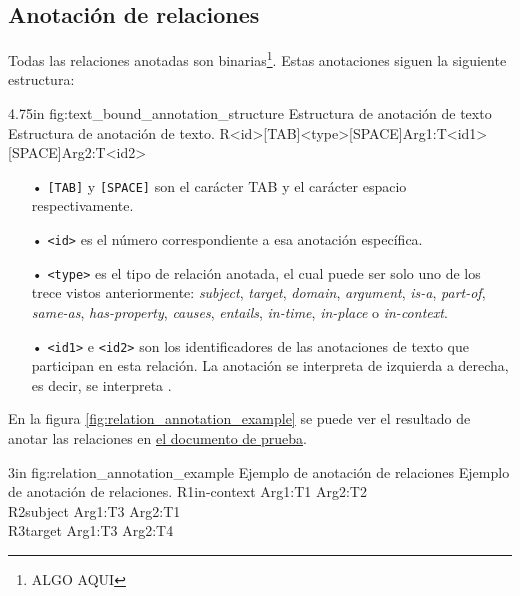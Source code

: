 \subsection{Anotación de relaciones}
Todas las relaciones anotadas son binarias\footnote{ALGO AQUI}. Estas anotaciones siguen la siguiente estructura:

\begin{annexample}
	[backgroundcolor=green!13]
	{4.75in}
	{fig:text_bound_annotation_structure}
	{Estructura de anotación de texto}
	{Estructura de anotación de texto.}
	R<id>[TAB]<type>[SPACE]Arg1:T<id1>[SPACE]Arg2:T<id2>
\end{annexample}

\begin{itemize}
	\item[•] \texttt{[TAB]} y \texttt{[SPACE]} son el carácter TAB y el carácter espacio respectivamente.
	\vspace{-0.1in}
	\item[•] \texttt{<id>} es el número correspondiente a esa anotación específica.
	\vspace{-0.1in}
	\item[•] \texttt{<type>} es el tipo de relación anotada, el cual puede ser solo uno de los trece vistos anteriormente: {\it subject}, {\it target}, {\it domain}, {\it argument}, {\it is-a}, {\it part-of}, {\it same-as}, {\it has-property}, {\it causes}, {\it entails}, {\it in-time}, {\it in-place} o {\it in-context}.
	\vspace{-0.1in}
	\item[•] \texttt{<id1>} e \texttt{<id2>} son los identificadores de las anotaciones de texto que participan en esta relación. La anotación se interpreta de izquierda a derecha, es decir, se interpreta .
\end{itemize}

En la figura \ref{fig:relation_annotation_example} se puede ver el resultado de anotar las relaciones en \hyperref[sentence:annotation_example]{el documento de prueba}.

\begin{annexample}
	[backgroundcolor=cyan!13]
	{3in}
	{fig:relation_annotation_example}
	{Ejemplo de anotación de relaciones}
	{Ejemplo de anotación de relaciones.}
	R1\space\space in-context Arg1:T1 Arg2:T2\\
	R2\space\space subject Arg1:T3 Arg2:T1\\
	R3\space\space target Arg1:T3 Arg2:T4
\end{annexample}

